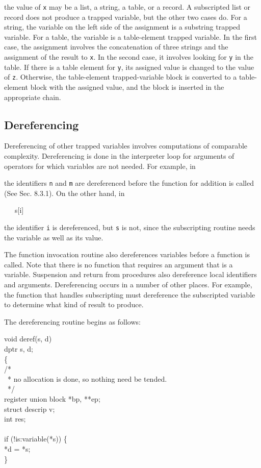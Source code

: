 
\noindent the value of \texttt{x} may be a list, a string, a table, or a
record. A subscripted list or record does not produce a trapped
variable, but the other two cases do. For a string, the variable on
the left side of the assignment is a substring trapped variable. For a
table, the variable is a table-element trapped variable. In the first
case, the assignment involves the concatenation of three strings and
the assignment of the result to \texttt{x}. In the second case, it involves
looking for \texttt{y} in the table. If there is a table element for \texttt{y}, its
assigned value is changed to the value of \texttt{z}.  Otherwise, the
table-element trapped-variable block is converted to a table-element
block with the assigned value, and the block is inserted in the
appropriate chain.

\subsection{Dereferencing}

Dereferencing of other trapped variables involves computations of
comparable complexity. Dereferencing is done in the interpreter loop
for arguments of operators for which variables are not needed. For
example, in


\noindent the identifiers \texttt{n} and \texttt{m} are dereferenced before the function
for addition is called (See Sec. 8.3.1). On the other hand, in

{\ttfamily\mdseries
\ \ \ s[i]}

\noindent the identifier \texttt{i} is dereferenced, but \texttt{s} is not, since the
subscripting routine needs the variable as well as its value.

The function invocation routine also dereferences variables before a
function is called. Note that there is no function that requires an
argument that is a variable. Suspension and return from procedures
also dereference local identifiers and arguments. Dereferencing occurs
in a number of other places. For example, the function that handles
subscripting must dereference the subscripted variable to determine
what kind of result to produce.

The dereferencing routine begins as follows:

\begin{iconcode}
void deref(s, d)\\
dptr s, d;\\
\>\{\\
\>/*\\
\>\ * no allocation is done, so nothing need be tended.\\
\>\ */\\
\>register union block *bp, **ep;\\
\>struct descrip v;\\
\>int res;\\
\\
\>if (!is:variable(*s)) \{\\
\>\>*d = *s;\\
\>\>\}
\end{iconcode}


